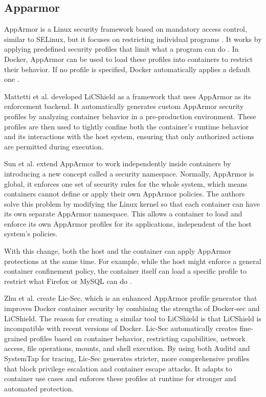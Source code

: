 \documentclass[12pt]{report}
\begin{document}
\begin{doublespace}
\section{Apparmor}

AppArmor is a Linux security framework based on mandatory access control, similar to SELinux, but it focuses on restricting individual programs \cite{zhu2021lic}. It works by applying predefined security profiles that limit what a program can do \cite{zhu2021lic}. In Docker, AppArmor can be used to load these profiles into containers to restrict their behavior. If no profile is specified, Docker automatically applies a default one \cite{zhu2021lic}.

Mattetti et al. \cite{mattetti2015securing} developed LiCShield as a framework that uses AppArmor as its enforcement backend. It automatically generates custom AppArmor security profiles by analyzing container behavior in a pre-production environment. These profiles are then used to tightly confine both the container’s runtime behavior and its interactions with the host system, ensuring that only authorized actions are permitted during execution.

Sun et al. \cite{sun2018security} extend AppArmor to work independently inside containers by introducing a new concept called a security namespace. Normally, AppArmor is global, it enforces one set of security rules for the whole system, which means containers cannot define or apply their own AppArmor policies. The authors solve this problem by modifying the Linux kernel so that each container can have its own separate AppArmor namespace. This allows a container to load and enforce its own AppArmor profiles for its applications, independent of the host system's policies.

With this change, both the host and the container can apply AppArmor protections at the same time. For example, while the host might enforce a general container confinement policy, the container itself can load a specific profile to restrict what Firefox or MySQL can do \cite{sun2018security}. 

Zhu et al. \cite{zhu2021lic} create Lic-Sec, which is an enhanced AppArmor profile generator that improves Docker container security by combining the strengths of Docker-sec and LiCShield. The reason for creating a similar tool to LiCShield is that LiCShield is incompatible with recent versions of Docker. Lic-Sec automatically creates fine-grained profiles based on container behavior, restricting capabilities, network access, file operations, mounts, and shell execution. By using both Auditd and SystemTap for tracing, Lic-Sec generates stricter, more comprehensive profiles that block privilege escalation and container escape attacks. It adapts to container use cases and enforces these profiles at runtime for stronger and automated protection.


\end{doublespace}
\end{document}
